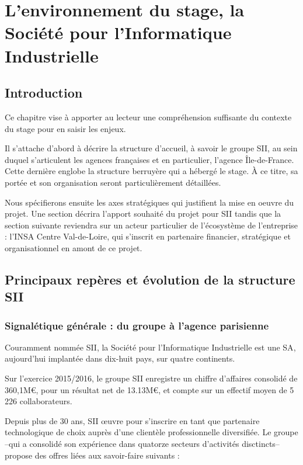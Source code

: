 \chapter{L'environnement du stage, la Société pour l'Informatique Industrielle}

\section {Introduction}
Ce chapitre vise à apporter au lecteur une compréhension suffisante du contexte du stage pour en saisir les enjeux. 

Il s'attache d'abord à décrire la structure d'accueil, à savoir le groupe \gls{SII}, au sein duquel s'articulent les agences françaises et en particulier, l'agence \^{I}le-de-France.
Cette dernière englobe la structure berruyère qui a hébergé le stage. \`{A} ce titre, sa portée et son organisation seront particulièrement détaillées. 

Nous spécifierons ensuite les axes stratégiques qui justifient la mise en oeuvre du projet. 
Une section décrira l'apport souhaité du projet pour SII tandis que la section suivante reviendra sur un acteur particulier de l'écosystème de l'entreprise : l'INSA Centre Val-de-Loire, qui s'inscrit en partenaire financier, 
stratégique et organisationnel en amont de ce projet.

\section{Principaux repères et évolution de la structure SII}

\subsection{Signalétique générale : du groupe à l'agence parisienne}

Couramment nommée \gls{SII}, la Société pour l'Informatique Industrielle est une \gls{SA}, aujourd'hui implantée dans dix-huit pays, sur quatre continents.

Sur l'exercice 2015/2016, le groupe SII enregistre un chiffre d'affaires consolidé de 360,1M\euro\cite{Bib_exercice_2015_2016}, pour un résultat net de 13.13M\euro\cite{Bib_exercice_2015_2016}, et compte sur un effectif moyen de 5 226 collaborateurs\cite{Bib_exercice_2015_2016}. 

Depuis plus de 30 ans\cite{Bib_exercice_2015_2016}\cite{Bib_memento_ag_idf}, SII \oe{}uvre pour s'inscrire en tant que partenaire technologique de choix auprès d'une clientèle professionnelle diversifiée. 
Le groupe --qui a consolidé son expérience dans quatorze secteurs d'activités disctincts-- propose des offres liées aux savoir-faire suivants : 

